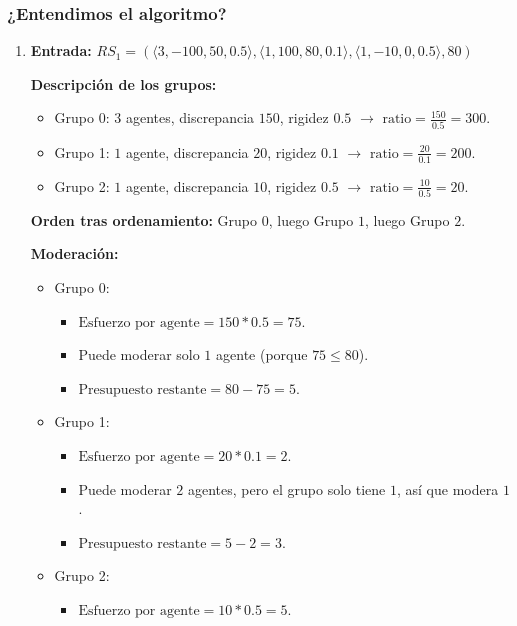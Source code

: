 \subsubsection{¿Entendimos el algoritmo?}

\begin{enumerate}
	\item \textbf{Entrada:} $RS_1 = (\langle 3,-100,50,0.5 \rangle,\langle 1,100,80,0.1 \rangle,\langle 1,-10,0,0.5 \rangle,80)$

	\textbf{Descripción de los grupos:}
		\begin{itemize}
			\item Grupo 0: $3$ agentes, discrepancia $150$, rigidez $0.5$ $\rightarrow$ $\text{ratio} = \frac{ 150 }{ 0.5 } = 300$.

			\item Grupo 1: $1$ agente, discrepancia $20$, rigidez $0.1$ $\rightarrow$ $\text{ratio} = \frac{ 20 }{ 0.1 } = 200$.

			\item Grupo 2: $1$ agente, discrepancia $10$, rigidez $0.5$ $\rightarrow$ $\text{ratio} = \frac{ 10 }{ 0.5 } = 20$.
		\end{itemize}

	\textbf{Orden tras ordenamiento:} Grupo $0$, luego Grupo $1$, luego Grupo $2$.

	\textbf{Moderación:}
	\begin{itemize}
		\item Grupo 0:
			\begin{itemize}
				\item $\text{Esfuerzo por agente} = 150 * 0.5 = 75$.

				\item Puede moderar solo $1$ agente (porque $75 \leq 80$).

				\item $\text{Presupuesto restante} = 80 - 75 = 5$.
			\end{itemize}
		\item Grupo 1:
			\begin{itemize}
				\item $\text{Esfuerzo por agente} = 20 * 0.1 = 2$.

				\item Puede moderar $2$ agentes, pero el grupo solo tiene $1$, así que modera $1$.

				\item $\text{Presupuesto restante} = 5 - 2 = 3$.
			\end{itemize}
		\item Grupo 2:
			\begin{itemize}
				\item $\text{Esfuerzo por agente} = 10 * 0.5 = 5$.


\end{itemize}
\end{itemize}
\end{enumerate}

